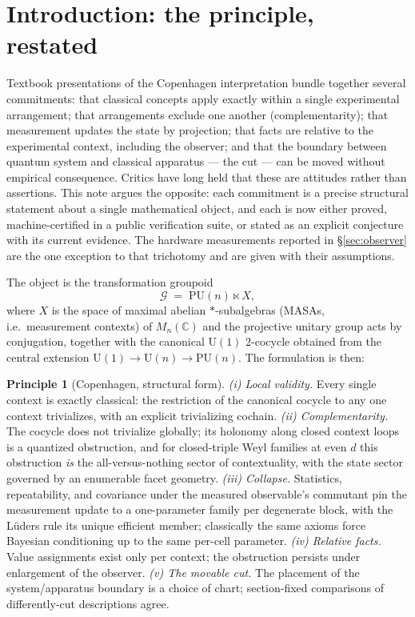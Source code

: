 \documentclass[11pt]{article}
\theoremstyle{definition}
\newtheorem{principle}{Principle}
\theoremstyle{remark}
\newcommand{\U}{\mathrm{U}}
\newcommand{\PU}{\mathrm{PU}}
\begin{document}
\section{Introduction: the principle, restated}\label{sec:intro}
Textbook presentations of the Copenhagen interpretation bundle together several
commitments: that classical concepts apply exactly within a single experimental
arrangement; that arrangements exclude one another (complementarity); that measurement
updates the state by projection; that facts are relative to the experimental context,
including the observer; and that the boundary between quantum system and classical
apparatus --- the cut --- can be moved without empirical consequence. Critics have long
held that these are attitudes rather than assertions. This note argues the opposite:
each commitment is a precise structural statement about a single mathematical object,
and each is now either proved, machine-certified in a public verification suite, or
stated as an explicit conjecture with its current evidence. The hardware measurements
reported in \S\ref{sec:observer} are the one exception to that trichotomy and are given
with their assumptions.

The object is the transformation groupoid
\[
\mathcal G \;=\; \PU(n)\ltimes X,
\]
where $X$ is the space of maximal abelian $*$-subalgebras (MASAs, i.e.\ measurement
contexts) of $M_n(\mathbb C)$ and the projective unitary group acts by conjugation,
together with the canonical $\U(1)$ $2$-cocycle obtained from the central extension
$\U(1)\to\U(n)\to\PU(n)$. The formulation is then:

\begin{principle}[Copenhagen, structural form]\label{prin}
\emph{(i) Local validity.} Every single context is exactly classical: the restriction of
the canonical cocycle to any one context trivializes, with an explicit trivializing
cochain. \emph{(ii) Complementarity.} The cocycle does not trivialize globally; its
holonomy along closed context loops is a quantized obstruction, and for closed-triple Weyl
families at even $d$ this obstruction \emph{is} the all-versus-nothing sector of
contextuality, with the state sector governed by an enumerable facet geometry. \emph{(iii) Collapse.} Statistics, repeatability, and covariance under the measured
observable's commutant pin the
measurement update to a one-parameter family per degenerate block, with the L\"uders
rule its unique efficient member; classically the same axioms force Bayesian
conditioning up to the same per-cell parameter. \emph{(iv) Relative facts.} Value assignments
exist only per context; the obstruction persists under enlargement of the observer.
\emph{(v) The movable cut.} The placement of the system/apparatus boundary is a choice
of chart; section-fixed comparisons of differently-cut descriptions agree.
\end{principle}
\end{document}
